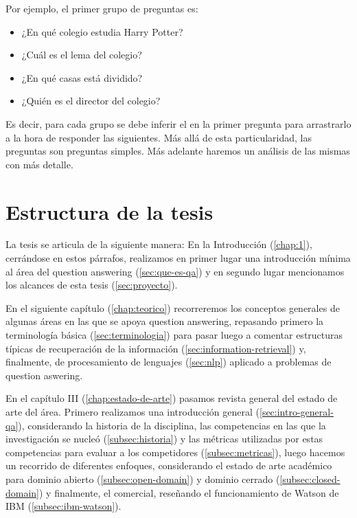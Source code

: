 Por ejemplo, el primer grupo de preguntas es:
\begin{itemize}
\item ¿En qué colegio estudia Harry Potter?
\item ¿Cuál es el lema del colegio?
\item ¿En qué casas está dividido?
\item ¿Quién es el director del colegio?
\end{itemize}
Es decir, para cada grupo se debe inferir el  en la primer pregunta para arrastrarlo a la hora de responder las siguientes. Más allá de esta particularidad,
las preguntas son preguntas simples. Más adelante haremos un análisis de las mismas con más detalle.


\section{Estructura de la tesis}
\faltadependiente

La tesis se articula de la siguiente manera: En la Introducción (\ref{chap:1}), cerrándose en estos párrafos, realizamos en primer lugar una introducción mínima al área del question answering (\ref{sec:que-es-qa}) y en segundo lugar mencionamos los alcances de esta tesis (\ref{sec:proyecto}).

En el siguiente capítulo (\ref{chap:teorico}) recorreremos los conceptos generales de algunas áreas en las que se apoya question answering, repasando primero la terminología básica (\ref{sec:terminologia}) para pasar luego a comentar estructuras típicas de recuperación de la información (\ref{sec:information-retrieval}) y, finalmente, de procesamiento de lenguajes (\ref{sec:nlp}) aplicado a problemas de question aswering.

En el capítulo III (\ref{chap:estado-de-arte}) pasamos revista general del estado de arte del área. Primero realizamos una introducción general (\ref{sec:intro-general-qa}), considerando la historia de la disciplina, las competencias en las que la investigación se nucleó (\ref{subsec:historia}) y las métricas utilizadas por estas competencias para evaluar a los competidores (\ref{subsec:metricas}), luego hacemos un recorrido de diferentes enfoques, considerando el estado de arte académico para dominio abierto (\ref{subsec:open-domain}) y dominio cerrado (\ref{subsec:closed-domain}) y finalmente, el comercial, reseñando el funcionamiento de Watson de IBM (\ref{subsec:ibm-watson}).


